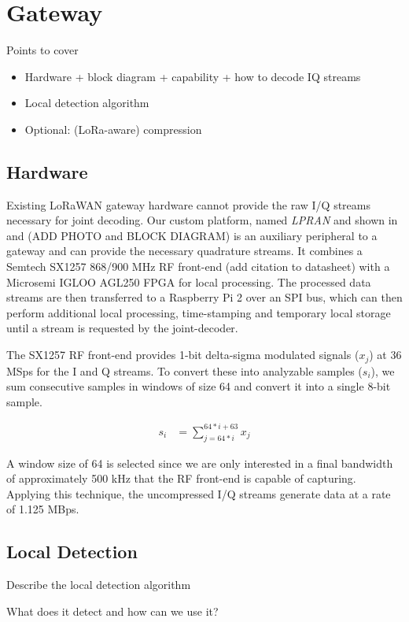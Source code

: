 \section{Gateway}
\label{sec:gateway}

{\color{blue} Points to cover
\begin{itemize}
    \item Hardware + block diagram + capability + how to decode IQ streams
    \item Local detection algorithm
    \item Optional: (LoRa-aware) compression
\end{itemize}

}

\subsection{Hardware}
\label{sec:hardware}

Existing LoRaWAN gateway hardware cannot provide the raw I/Q streams necessary
for joint decoding. Our custom platform, named \textit{LPRAN} and shown in
 and  {\color{blue} (ADD PHOTO and
BLOCK DIAGRAM)} is an auxiliary peripheral to a gateway and can provide the
necessary quadrature streams. It combines a Semtech SX1257 868/900 MHz RF
front-end {\color{blue} (add citation to datasheet)} with a Microsemi IGLOO
AGL250 FPGA for local processing. The processed data streams are then
transferred to a Raspberry Pi 2 over an SPI bus, which can then perform
additional local processing, time-stamping and temporary local storage until a
stream is requested by the joint-decoder.

The SX1257 RF front-end provides 1-bit delta-sigma modulated signals ($x_j$)
at 36 MSps for the I and Q streams. To convert these into analyzable samples
($s_i$), we sum consecutive samples in windows of size 64 and convert it into
a single 8-bit sample.

\begin{align*}
s_i &= \sum_{j=64*i}^{64*i + 63} x_j
\end{align*}

A window size of 64 is selected since we are only interested in a final
bandwidth of approximately 500 kHz that the RF front-end is capable of
capturing. Applying this technique, the uncompressed I/Q streams generate data
at a rate of 1.125 MBps.

\subsection{Local Detection}
\label{sec:local-detection}

{\color{blue}

Describe the local detection algorithm

What does it detect and how can we use it?

}